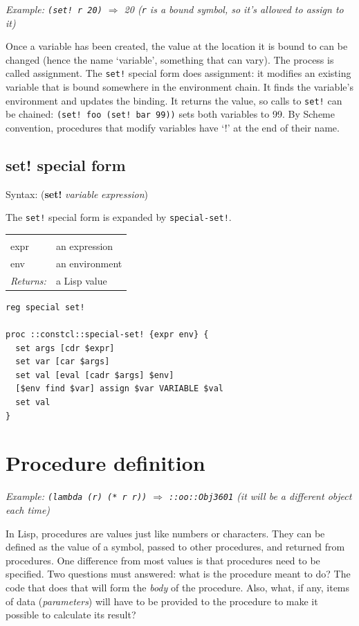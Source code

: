 \documentclass[twoside,9pt]{report}
\begin{document}
\emph{Example: \texttt{(set! r 20)} $\Rightarrow$ 20 (\texttt{r} is a bound symbol, so it's allowed to assign to it)}


Once a variable has been created, the value at the location it is bound to can be changed (hence the name `variable', something that can vary). The process is called assignment. The \texttt{set!} special form does assignment: it modifies an existing variable that is bound somewhere in the environment chain. It finds the variable's environment and updates the binding. It returns the value, so calls to \texttt{set!} can be chained: \texttt{(set! foo (set! bar 99))} sets both variables to 99. By Scheme convention, procedures that modify variables have `!' at the end of their name.

\subsection{set! special form}
\label{set"!-special-form}


Syntax: (\textbf{set!} \emph{variable} \emph{expression})


The \texttt{set!} special form is expanded by \texttt{special-set!}.

\noindent\begin{tabular}{ |p{1.9cm} p{8cm}| }
\hline
\rowcolor[HTML]{CCCCCC} \multicolumn{2}{|l|}{\bf special-set! (internal)} \\
expr & an expression \\
env & an environment \\
\textit{Returns:} & a Lisp value \\
\hline
\end{tabular}
\begin{lstlisting}
reg special set!

proc ::constcl::special-set! {expr env} {
  set args [cdr $expr]
  set var [car $args]
  set val [eval [cadr $args] $env]
  [$env find $var] assign $var VARIABLE $val
  set val
}
\end{lstlisting}
\section{Procedure definition}
\label{procedure-definition}


\emph{Example: \texttt{(lambda (r) (* r r))} $\Rightarrow$ \texttt{::oo::Obj3601} (it will be a different object each time)}


In Lisp, procedures are values just like numbers or characters. They can be defined as the value of a symbol, passed to other procedures, and returned from procedures. One difference from most values is that procedures need to be specified. Two questions must answered: what is the procedure meant to do? The code that does that will form the \emph{body} of the procedure. Also, what, if any, items of data (\emph{parameters}) will have to be provided to the procedure to make it possible to calculate its result?
\end{document}

